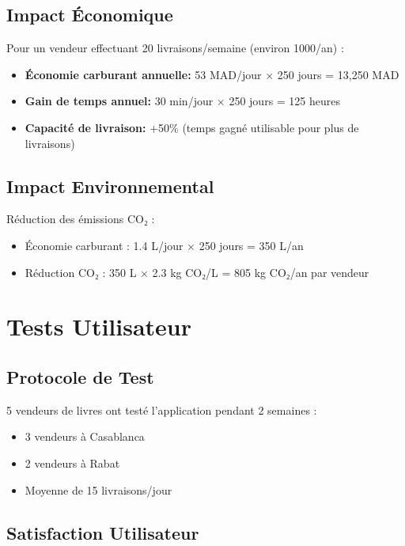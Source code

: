 \documentclass[12pt,a4paper]{report}
\begin{document}
\subsection{Impact Économique}

Pour un vendeur effectuant 20 livraisons/semaine (environ 1000/an) :

\begin{itemize}
    \item \textbf{Économie carburant annuelle:} 53 MAD/jour × 250 jours = 13,250 MAD
    \item \textbf{Gain de temps annuel:} 30 min/jour × 250 jours = 125 heures
    \item \textbf{Capacité de livraison:} +50\% (temps gagné utilisable pour plus de livraisons)
\end{itemize}

\subsection{Impact Environnemental}

Réduction des émissions CO₂ :
\begin{itemize}
    \item Économie carburant : 1.4 L/jour × 250 jours = 350 L/an
    \item Réduction CO₂ : 350 L × 2.3 kg CO₂/L = 805 kg CO₂/an par vendeur
\end{itemize}

\section{Tests Utilisateur}

\subsection{Protocole de Test}

5 vendeurs de livres ont testé l'application pendant 2 semaines :
\begin{itemize}
    \item 3 vendeurs à Casablanca
    \item 2 vendeurs à Rabat
    \item Moyenne de 15 livraisons/jour
\end{itemize}

\subsection{Satisfaction Utilisateur}
\end{document}
